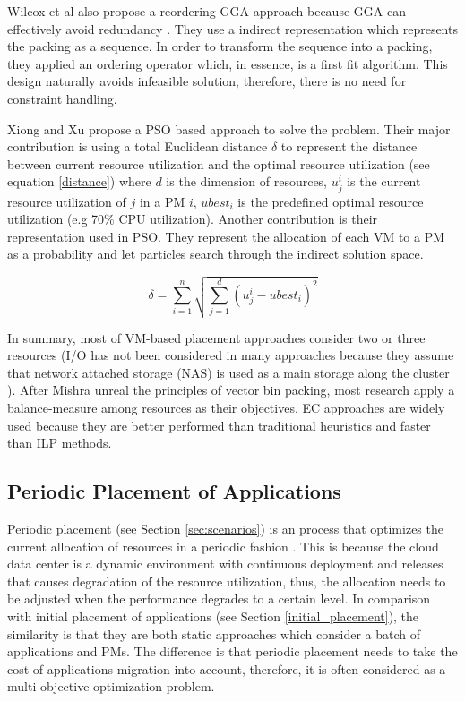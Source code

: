  Wilcox et al \cite{Wilcox:2011ea} also propose a reordering GGA approach because GGA can effectively avoid redundancy \cite{Falkenauer:1996hv}. They use a indirect representation \cite{Radcliffe:1991tp} which represents the packing as a sequence. In order to transform the sequence into a packing, they applied an ordering operator which, in essence, is a first fit algorithm. This design naturally avoids infeasible solution, therefore, there is no need for constraint handling. 


Xiong and Xu \cite{Xiong:2014jq} propose a PSO based approach to solve the problem. Their major contribution is using a total Euclidean distance $\delta$ to represent the distance between current resource utilization and the optimal resource utilization (see equation \ref{distance}) where $d$ is the dimension of resources, $u_j^i$ is the current resource utilization of $j$ in a PM $i$, $ubest_i$ is the predefined optimal resource utilization (e.g 70\% CPU utilization). Another contribution is their representation used in PSO. They represent the allocation of each VM to a PM as a probability and let particles search through the indirect solution space.

\begin{equation} \label{distance}
	\delta = \sum_{i=1}^n \sqrt{\sum_{j=1}^d (u_j^i - ubest_i)^2}
\end{equation}

In summary, most of VM-based placement approaches consider two or three resources (I/O has not been considered in many approaches because they assume that network attached storage (NAS) is used as a main storage along the cluster \cite{Murtazaev:2014eo}). After Mishra unreal the principles of vector bin packing, most research apply a balance-measure among resources as their objectives. EC approaches are widely used because they are better performed than traditional heuristics and faster than ILP methods.


\subsection{Periodic Placement of Applications}
Periodic placement (see Section \ref{sec:scenarios}) is an process that optimizes the current allocation of resources in a periodic fashion \cite{Mishra:2012kx}. This is because the cloud data center is a dynamic environment with continuous deployment and releases that causes degradation of the resource utilization, thus, the allocation needs to be adjusted when the performance degrades to a certain level. In comparison with initial placement of applications (see Section \ref{initial_placement}), the similarity is that they are both static approaches which consider a batch of applications and PMs. The difference is that periodic placement needs to take the cost of applications migration into account, therefore, it is often considered as a multi-objective optimization problem. 

